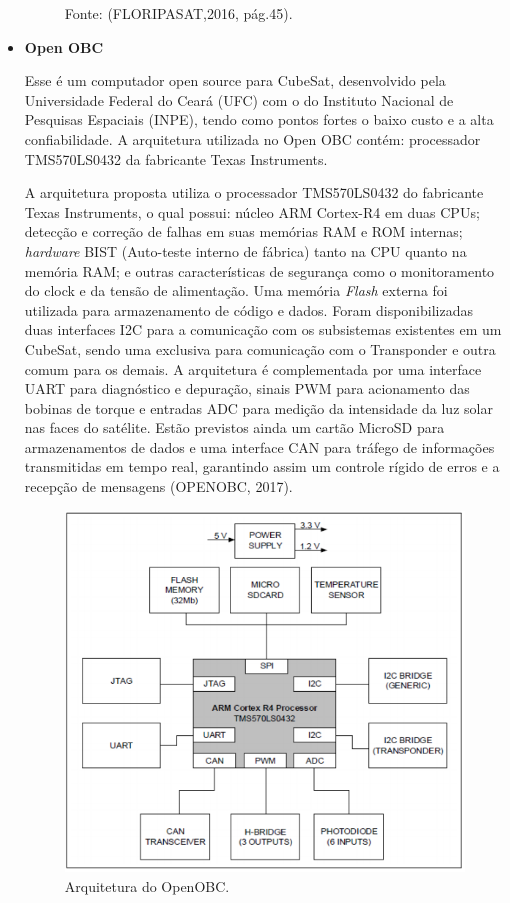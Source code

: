 \begin{itemize}
\begin{figure}[h]
	Fonte: (FLORIPASAT,2016, pág.45).\linebreak
	
	\label{fig12}
\end{figure}


\item \textbf{Open OBC}

Esse é um computador open source para CubeSat, desenvolvido pela Universidade Federal do Ceará (UFC) com o do Instituto Nacional de Pesquisas Espaciais (INPE), tendo como pontos fortes o baixo custo e a alta confiabilidade. A arquitetura utilizada no Open OBC  contém: processador TMS570LS0432 da fabricante Texas Instruments.

A arquitetura proposta utiliza o processador TMS570LS0432 do fabricante Texas Instruments, o qual possui: núcleo ARM Cortex-R4 em duas CPUs; detecção e correção de falhas em suas memórias RAM e ROM internas; \textit{hardware} BIST (Auto-teste interno de fábrica) tanto na CPU quanto na memória RAM; e outras características de segurança como o monitoramento do clock e da tensão de alimentação. Uma memória \textit{Flash} externa foi utilizada para armazenamento de código e dados. Foram disponibilizadas duas interfaces I2C para a comunicação com os subsistemas existentes em um CubeSat, sendo uma exclusiva para comunicação com o Transponder e outra comum para os demais. A arquitetura é complementada por uma interface UART para diagnóstico e depuração, sinais PWM para acionamento das bobinas de torque e entradas ADC para medição da intensidade da luz solar nas faces do satélite. Estão previstos ainda um cartão MicroSD para armazenamentos de dados e uma interface CAN para tráfego de informações transmitidas em tempo real, garantindo assim um controle rígido de erros e a recepção de mensagens (OPENOBC, 2017).

\begin{figure}[h]
	\centering
    \caption{Arquitetura do OpenOBC.}
    
	\includegraphics[keepaspectratio=true,scale=0.4]{figuras/openObc.PNG}
	

\end{figure}
\end{itemize}

